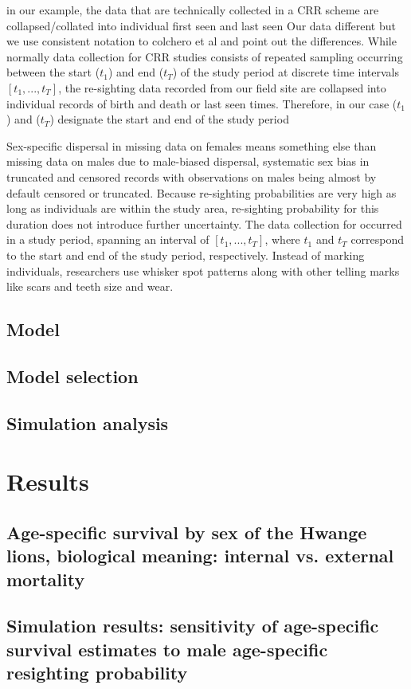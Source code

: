 in our example, the data that are technically collected in a CRR scheme are collapsed/collated into individual first seen and last seen 
Our data different but we use consistent notation to colchero et al and point out the differences. While normally data collection for CRR studies consists of repeated sampling occurring between the start ($t_1$) and end ($t_T$) of the study period at discrete time intervals $[t_1, ..., t_T]$, the re-sighting data recorded from our field site are collapsed into individual records of birth and death or last seen times. Therefore, in our case ($t_1$) and ($t_T$) designate the start and end of the study period

Sex-specific dispersal  in missing data on females  means something else than missing data on males due to male-biased dispersal, systematic sex bias in truncated and censored records with observations on males being almost by default censored or truncated. Because re-sighting probabilities are very high as long as individuals are within the study area, re-sighting probability for this duration does not introduce further uncertainty. 
The data collection for occurred in a study period, spanning an interval of $[t_1, ..., t_T]$, where $t_1$ and $t_T$ correspond to the start and end of the study period, respectively. Instead of marking individuals, researchers use whisker spot patterns along with other telling marks like scars and teeth size and wear\citep{Becker:2013ib}.

\subsection{Model}
\subsection{Model selection}

\subsection{Simulation analysis}
\section{Results}
\subsection{Age-specific survival by sex of the Hwange lions, biological meaning: internal vs. external mortality}
\subsection{Simulation results: sensitivity of age-specific survival estimates to male age-specific resighting probability}
